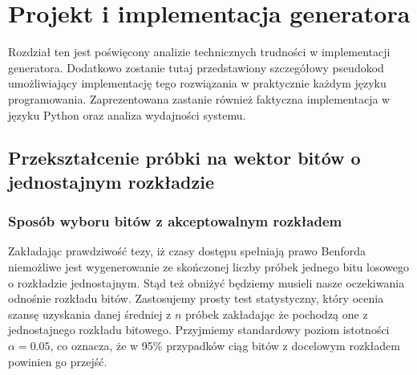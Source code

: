\chapter{Projekt i implementacja  generatora}
\thispagestyle{chapterBeginStyle}

Rozdział ten jest poświęcony analizie technicznych trudności w implementacji generatora. Dodatkowo zostanie tutaj przedstawiony szczegółowy pseudokod umożliwiający implementację tego rozwiązania w praktycznie każdym języku programowania. Zaprezentowana zastanie również faktyczna implementacja w języku Python oraz analiza wydajności systemu.

\section{Przekształcenie próbki na wektor bitów o jednostajnym rozkładzie}
\subsection{Sposób wyboru bitów z akceptowalnym rozkładem}
Zakładając prawdziwość tezy, iż czasy dostępu spełniają prawo Benforda niemożliwe jest wygenerowanie ze skończonej liczby próbek jednego bitu losowego o rozkładzie jednostajnym. Stąd też obniżyć będziemy musieli nasze oczekiwania odnośnie rozkładu bitów. Zastosujemy prosty test statystyczny, który ocenia szansę uzyskania danej średniej z $n$ próbek zakładając że pochodzą one z jednostajnego rozkładu bitowego. Przyjmiemy standardowy poziom istotności $\alpha = 0.05$, co oznacza, że w 95\% przypadków ciąg bitów z docelowym rozkładem powinien go przejść.
